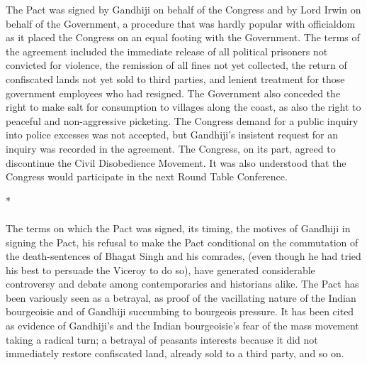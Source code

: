 \begin{multicols}{2}
The Pact was signed by Gandhiji on behalf of the Congress and by Lord Irwin on behalf of the Government, a procedure that was hardly popular with officialdom as it placed the Congress on an equal footing with the Government. The terms of the agreement included the immediate release of all political prisoners not convicted for violence, the remission of all fines not yet collected, the return of confiscated lands not yet sold to third parties, and lenient treatment for those government employees who had resigned. The Government also conceded the right to make salt for consumption to villages along the coast, as also the right to peaceful and non-aggressive picketing. The Congress demand for a public inquiry into police excesses was not accepted, but Gandhiji's insistent request for an inquiry was recorded in the agreement. The Congress, on its part, agreed to discontinue the Civil Disobedience Movement. It was also understood that the Congress would participate in the next Round Table Conference.

\begin{center}*\end{center}

\paragraph*{}
The terms on which the Pact was signed, its timing, the motives of Gandhiji in signing the Pact, his refusal to make the Pact conditional on the commutation of the death-sentences of Bhagat Singh and his comrades, (even though he had tried his best to persuade the Viceroy to do so), have generated considerable controversy and debate among contemporaries and historians alike. The Pact has been variously seen as a betrayal, as proof of the vacillating nature of the Indian bourgeoisie and of Gandhiji succumbing to bourgeois pressure. It has been cited as evidence of Gandhiji's and the Indian bourgeoisie's fear of the mass movement taking a radical turn; a betrayal of peasants interests because it did not immediately restore confiscated land, already sold to a third party, and so on.


\end{multicols}
